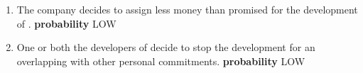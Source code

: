 \begin{itemize}
\begin{itemize}
		
		\begin{enumerate}
			\item The company decides to assign less money than promised for the development of \myTaxiService{}. \newline
			\textbf{probability} LOW
			\item One or both the developers of \myTaxiService{} decide to stop the development for an overlapping with other personal commitments.\newline
			\textbf{probability} LOW
		\end{enumerate}
	\end{itemize}
\end{itemize}
%






%